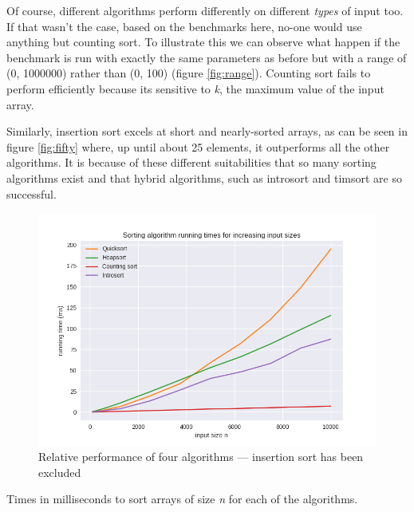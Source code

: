 \documentclass[12pt, a4paper]{article}
\begin{document}
Of course, different algorithms perform differently on different \emph{types} of input too. If that wasn't the case, based on the benchmarks here, no-one would use anything but counting sort. To illustrate this we can observe what happen if the benchmark is run with exactly the same parameters as before but with a range of (0, 1000000) rather than (0, 100) (figure \ref{fig:range}). Counting sort fails to perform efficiently because its sensitive to \emph{k}, the maximum value of the input array.

Similarly, insertion sort excels at short and nearly-sorted arrays, as can be seen in figure \ref{fig:fifty} where, up until about 25 elements, it outperforms all the other algorithms. It is because of these different suitabilities that so many sorting algorithms exist and that hybrid algorithms, such as introsort and timsort are so successful.

\begin{figure}
    \includegraphics[width=\linewidth]{bm_output/plot_1_linear_20210513-101605.png}
    \caption{Relative performance of four algorithms — insertion sort has been excluded}
    \label{fig:linear4}
\end{figure}


\begin{table}[H]
    \resizebox{\textwidth}{!}{%
    
    }
\caption{Times in milliseconds to sort arrays of size \emph{n} for each of the algorithms.}
\label{table:results}
\end{table}
\end{document}
